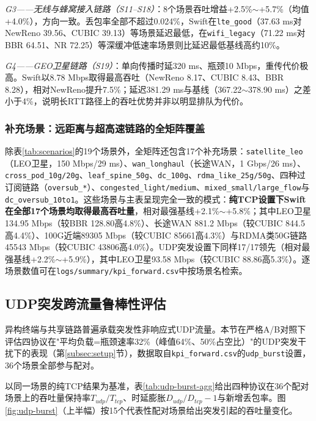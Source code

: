 \documentclass[10pt,twocolumn]{article}
\begin{document}
\textit{G3——无线与蜂窝接入链路（S11--S18）}：8个场景吞吐增益+2.5\%$\sim$+5.7\%（均值+4.0\%），方向一致。丢包率全部不超过0.024\%，Swift在\texttt{lte\_good}（37.63 ms对NewReno 39.56、CUBIC 39.13）等场景延迟最低，在\texttt{wifi\_legacy}（71.22 ms对BBR 64.51、NR 72.25）等深缓冲低速率场景则比延迟最低基线高约10\%。

\textit{G4——GEO卫星链路（S19）}：单向传播时延320 ms、瓶颈10 Mbps，重传代价极高。Swift以8.78 Mbps取得最高吞吐（NewReno 8.17、CUBIC 8.43、BBR 8.28），相对NewReno提升7.5\%；延迟381.29 ms与基线（367.22$\sim$378.90 ms）之差小于4\%，说明长RTT路径上的吞吐优势并非以明显排队为代价。

\subsubsection{补充场景：远距离与超高速链路的全矩阵覆盖}
\label{subsubsec:extended}

除表\ref{tab:scenarios}的19个场景外，全矩阵还包含17个补充场景：\texttt{satellite\_leo}（LEO卫星，150 Mbps/29 ms）、\texttt{wan\_longhaul}（长途WAN，1 Gbps/26 ms）、\texttt{cross\_pod\_10g/20g}、\texttt{leaf\_spine\_50g}、\texttt{dc\_100g}、\texttt{rdma\_like\_25g/50g}、四种过订阅链路（\texttt{oversub\_*}）、\texttt{congested\_light/medium}、\texttt{mixed\_small/large\_flow}与\texttt{dc\_oversub\_10to1}。这些场景与主表呈现完全一致的模式：\textbf{纯TCP设置下Swift在全部17个场景均取得最高吞吐量}，相对最强基线+2.1\%$\sim$+5.8\%；其中LEO卫星134.95 Mbps（较BBR 128.80高4.8\%）、长途WAN 881.2 Mbps（较CUBIC 844.5高4.4\%）、100G近端89305 Mbps（较CUBIC 85661高4.3\%）与RDMA类50G链路45543 Mbps（较CUBIC 43806高4.0\%）。UDP突发设置下同样17/17领先（相对最强基线+2.2\%$\sim$+5.9\%），其中LEO卫星93.58 Mbps（较CUBIC 88.86高5.3\%）。逐场景数值可在\texttt{logs/summary/kpi\_forward.csv}中按场景名检索。

\subsection{UDP突发跨流量鲁棒性评估}
\label{subsec:udp-burst}

异构终端与共享链路普遍承载突发性非响应式UDP流量。本节在严格A/B对照下评估四协议在"平均负载=瓶颈速率32\%（峰值64\%、50\%占空比）"的UDP突发干扰下的表现（第\ref{subsec:setup}节），数据取自\texttt{kpi\_forward.csv}的\texttt{udp\_burst}设置，36个场景全部参与配对。

以同一场景的纯TCP结果为基准，表\ref{tab:udp-burst-agg}给出四种协议在36个配对场景上的吞吐量保持率$T_{udp}/T_{tcp}$、时延膨胀$D_{udp}/D_{tcp}-1$与新增丢包率。图\ref{fig:udp-burst}（上半幅）按15个代表性配对场景给出突发引起的吞吐量变化。
\end{document}
